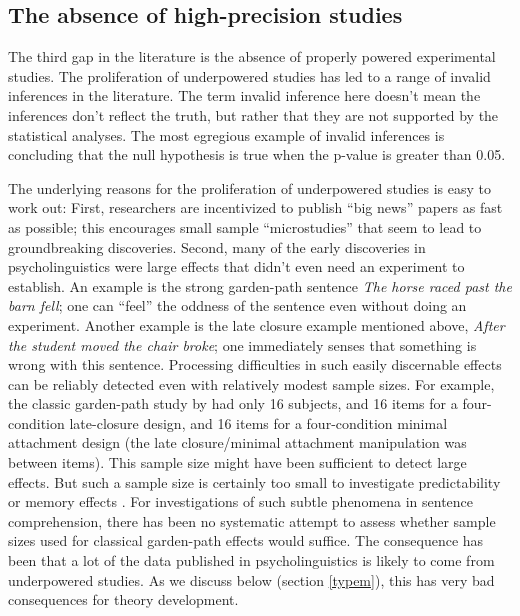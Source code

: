 \documentclass{cambridge7A}\usepackage[]{graphicx}\usepackage[]{color}
\begin{document}
\subsection{The absence of high-precision studies}

The third gap in the literature is the absence of properly powered experimental studies. The proliferation of underpowered studies has led to a range of invalid inferences in the literature. The term invalid inference here doesn't mean the inferences don't reflect the truth, but rather that they are not supported by the statistical analyses. The most egregious example of invalid inferences is concluding that the null hypothesis is true when the p-value is greater than 0.05.

The underlying reasons for the proliferation of underpowered studies is easy to work out: First,
researchers are incentivized to publish ``big news'' papers as fast as
possible; this encourages small sample ``microstudies'' that seem to
lead to groundbreaking discoveries. Second, many of the early
discoveries in psycholinguistics were large effects that didn't even
need an experiment to establish. An example is the strong garden-path
sentence \textit{The horse raced past the barn fell}; one can ``feel'' the oddness of the sentence even without doing an experiment.  Another example
is the late closure example mentioned above, \textit{After the student 
moved the chair broke}; one immediately senses that something is wrong with this sentence. Processing difficulties in such easily discernable effects can be reliably detected even with relatively modest sample sizes. For example, the classic garden-path  study by \cite{FrazierRayner1982} had only 16
subjects, and 16 items for a four-condition late-closure design, and
16 items for a four-condition minimal attachment design (the late 
closure/minimal attachment manipulation was between items). This
sample size might have been sufficient to detect large effects. But such a sample size is 
certainly too small to investigate predictability
\citep{VasishthMertzenJaegerGelman2018} or memory effects
\citep{JaegerEngelmannVasishth2017,MertzenEtAlAMLaP2019,JaegerMertzenVanDykeVasishth2019}.  For investigations of such subtle phenomena in sentence comprehension, there has been no
systematic attempt to assess whether sample sizes used for classical 
garden-path effects would suffice.  The consequence has been that a
lot of the data published in psycholinguistics is likely to come from
underpowered studies. As we discuss below (section \ref{typem}), this has very bad consequences for theory development.
\end{document}
